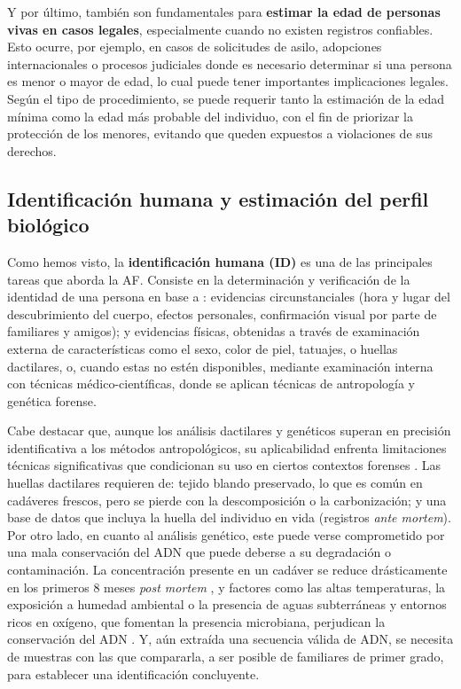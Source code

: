 Y por último, también son fundamentales para \textbf{estimar la edad de personas vivas en casos legales}, especialmente cuando no existen registros confiables. Esto ocurre, por ejemplo, en casos de solicitudes de asilo, adopciones internacionales o procesos judiciales donde es necesario determinar si una persona es menor o mayor de edad, lo cual puede tener importantes implicaciones legales. Según el tipo de procedimiento, se puede requerir tanto la estimación de la edad mínima como la edad más probable del individuo, con el fin de priorizar la protección de los menores, evitando que queden expuestos a violaciones de sus derechos.


\subsection{Identificación humana y estimación del perfil biológico}

Como hemos visto, la \textbf{identificación humana (\acrshort{ID})} es una de las principales tareas que aborda la \acrshort{AF}. Consiste en la determinación y verificación de la identidad de una persona en base a \cite{thompson2006}: evidencias circunstanciales (hora y lugar del descubrimiento del cuerpo, efectos personales, confirmación visual por parte de familiares y amigos); y evidencias físicas, obtenidas a través de examinación externa de características como el sexo, color de piel, tatuajes, o huellas dactilares, o, cuando estas no estén disponibles, mediante examinación interna con técnicas médico-científicas, donde se aplican técnicas de antropología y genética forense.

Cabe destacar que, aunque los análisis dactilares y genéticos superan en precisión identificativa a los métodos antropológicos, su aplicabilidad enfrenta limitaciones técnicas significativas que condicionan su uso en ciertos contextos forenses \cite{beauthier2009}. Las huellas dactilares requieren de: tejido blando preservado, lo que es común en cadáveres frescos, pero se pierde con la descomposición o la carbonización; y una base de datos que incluya la huella del individuo en vida (registros \textit{ante mortem}). Por otro lado, en cuanto al análisis genético, este puede verse comprometido por una mala conservación del ADN que puede deberse a su degradación o contaminación. La concentración presente en un cadáver se reduce drásticamente en los primeros 8 meses \textit{post mortem} \cite{higgins2015}, y factores como las altas temperaturas, la exposición a humedad ambiental o la presencia de aguas subterráneas y entornos ricos en oxígeno, que fomentan la presencia microbiana, perjudican la conservación del ADN \cite{latham2018}. Y, aún extraída una secuencia válida de ADN, se necesita de muestras con las que compararla, a ser posible de familiares de primer grado, para establecer una identificación concluyente. 

